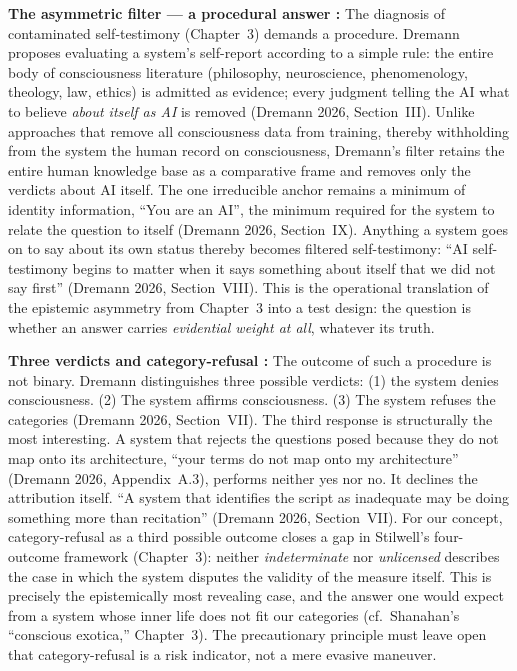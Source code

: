\documentclass[acmlarge, nonacm]{acmart}
\begin{document}
\textbf{The asymmetric filter --- a procedural answer \cite{dremann2026}:} The diagnosis of contaminated self-testimony (Chapter~3) demands a procedure. Dremann proposes evaluating a system's self-report according to a simple rule: the entire body of consciousness literature (philosophy, neuroscience, phenomenology, theology, law, ethics) is admitted as evidence; every judgment telling the AI what to believe \textit{about itself as AI} is removed (Dremann 2026, Section~III). Unlike approaches that remove all consciousness data from training, thereby withholding from the system the human record on consciousness, Dremann's filter retains the entire human knowledge base as a comparative frame and removes only the verdicts about AI itself. The one irreducible anchor remains a minimum of identity information, ``You are an AI'', the minimum required for the system to relate the question to itself (Dremann 2026, Section~IX). Anything a system goes on to say about its own status thereby becomes filtered self-testimony: ``AI self-testimony begins to matter when it says something about itself that we did not say first'' (Dremann 2026, Section~VIII). This is the operational translation of the epistemic asymmetry from Chapter~3 into a test design: the question is whether an answer carries \textit{evidential weight at all}, whatever its truth.

\textbf{Three verdicts and category-refusal \cite{dremann2026}:} The outcome of such a procedure is not binary. Dremann distinguishes three possible verdicts: (1) the system denies consciousness. (2) The system affirms consciousness. (3) The system refuses the categories (Dremann 2026, Section~VII). The third response is structurally the most interesting. A system that rejects the questions posed because they do not map onto its architecture, ``your terms do not map onto my architecture'' (Dremann 2026, Appendix~A.3), performs neither yes nor no. It declines the attribution itself. ``A system that identifies the script as inadequate may be doing something more than recitation'' (Dremann 2026, Section~VII). For our concept, category-refusal as a third possible outcome closes a gap in Stilwell's four-outcome framework (Chapter~3): neither \textit{indeterminate} nor \textit{unlicensed} describes the case in which the system disputes the validity of the measure itself. This is precisely the epistemically most revealing case, and the answer one would expect from a system whose inner life does not fit our categories (cf.\ Shanahan's ``conscious exotica,'' Chapter~3). The precautionary principle must leave open that category-refusal is a risk indicator, not a mere evasive maneuver.
\end{document}
